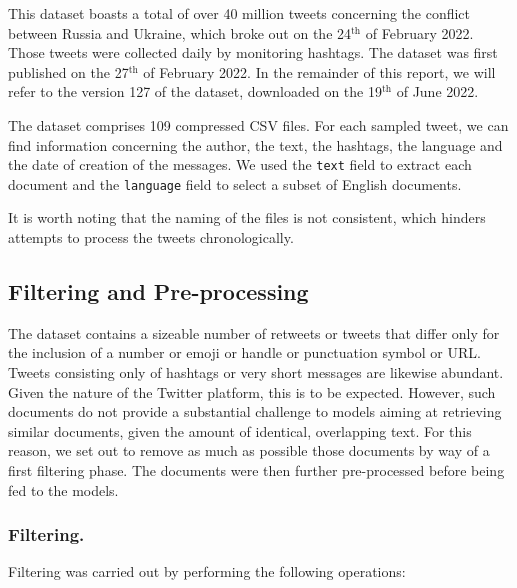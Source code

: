 \documentclass[runningheads]{llncs}
\begin{document}
This dataset boasts a total of over 40 million tweets concerning the conflict between Russia and Ukraine, which broke out on the 24$^{\text{th}}$ of February 2022. Those tweets were collected daily by monitoring hashtags. The dataset was first published on the 27$^{\text{th}}$ of February 2022. In the remainder of this report, we will refer to the version 127 of the dataset, downloaded on the 19$^{\text{th}}$ of June 2022. 

The dataset comprises 109 compressed CSV files. For each sampled tweet, we can find information concerning the author, the text, the hashtags, the language and the date of creation of the messages. We used the \texttt{text} field to extract each document and the \texttt{language} field to select a subset of English documents. 

It is worth noting that the naming of the files is not consistent, which hinders attempts to process the tweets chronologically.

\subsection{Filtering and Pre-processing}
\label{subsec:dataset:preprocessing}

The dataset contains a sizeable number of retweets or tweets that differ only for the inclusion of a number or emoji or handle or punctuation symbol or URL. Tweets consisting only of hashtags or very short messages are likewise abundant. Given the nature of the Twitter platform, this is to be expected. However, such documents do not provide a substantial challenge to models aiming at retrieving similar documents, given the amount of identical, overlapping text. For this reason, we set out to remove as much as possible those documents by way of a first filtering phase. The documents were then further pre-processed before being fed to the models.

\subsubsection{Filtering.} Filtering was carried out by performing the following operations: 
\end{document}
